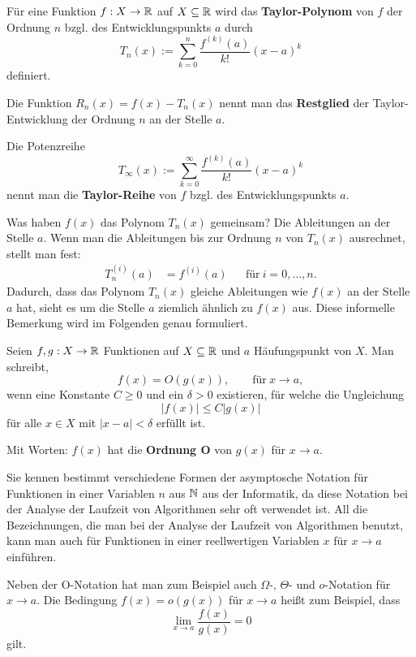 \begin{defn} 
	Für eine Funktion $f : X \to \mathbb{R}$ auf $X \subseteq \mathbb{R}$ wird das \textbf{Taylor-Polynom} von $f$ der Ordnung $n$ bzgl. des Entwicklungspunkts $a$ durch 
	\[
		T_n(x) := \sum_{k=0}^n \frac{f^{(k)}(a)}{k!} (x-a)^k
	\]
	definiert. 
	
	Die Funktion $R_n(x) = f(x) - T_n(x)$ nennt man das \textbf{Restglied} der Taylor-Entwicklung der Ordnung $n$ an der Stelle $a$. 
	
	Die Potenzreihe 
	\[
		T_\infty(x) := \sum_{k=0}^\infty \frac{f^{(k)}(a)}{k!} (x-a)^k
	\]
	nennt man die \textbf{Taylor-Reihe} von $f$ bzgl. des Entwicklungspunkts $a$. 
\end{defn} 

\begin{bem}
	Was haben $f(x)$ das Polynom $T_n(x)$ gemeinsam? Die Ableitungen an der Stelle $a$. Wenn man die Ableitungen bis zur Ordnung $n$ von $T_n(x)$ ausrechnet, stellt man fest: 
	\begin{align*}
		T_n^{(i)}(a) & = f^{(i)}(a)  & & \text{für} \ i=0,\ldots,n.
	\end{align*} 
	Dadurch, dass das Polynom $T_n(x)$ gleiche Ableitungen wie $f(x)$ an der Stelle $a$ hat, sieht es um die Stelle $a$ ziemlich ähnlich zu $f(x)$ aus. Diese informelle Bemerkung wird im Folgenden genau formuliert.
\end{bem} 


\begin{defn}  
	Seien $f,g : X \to \mathbb{R}$ Funktionen auf $X \subseteq \mathbb{R}$ und $a$ Häufungspunkt von $X$. Man schreibt, 
	\[
		f(x) = O(g(x)), \qquad \text{für} \ x \to a,
	\] 
	wenn eine Konstante $C\ge 0$ und ein $\delta > 0$ existieren, für welche die Ungleichung 
	\[
		|f(x)| \le C |g(x)| 
	\]
	für alle $x \in X$ mit $|x-a| < \delta$ erfüllt ist. 
	
	Mit Worten: $f(x)$ hat die \textbf{Ordnung O} von $g(x)$ für $x \to a$.  
\end{defn} 


\begin{bem}
	Sie kennen bestimmt verschiedene Formen der asymptosche Notation für Funktionen  in einer Variablen $n$ aus $\mathbb{N}$ aus der Informatik, da diese Notation bei der Analyse der Laufzeit von Algorithmen sehr oft verwendet ist. All die Bezeichnungen, die man bei der Analyse der Laufzeit von Algorithmen benutzt, kann man auch für Funktionen in einer reellwertigen Variablen $x$ für $x \to a$ einführen. 
	
	Neben der O-Notation hat man zum Beispiel auch $\Omega$-, $\Theta$- und $o$-Notation für $x \to a$. Die Bedingung $f(x) = o(g(x))$ für $x \to a$ heißt zum Beispiel, dass 
	\[
		\lim_{x \to a} \frac{f(x)}{g(x)} = 0
	\]
	gilt. 
\end{bem} 

